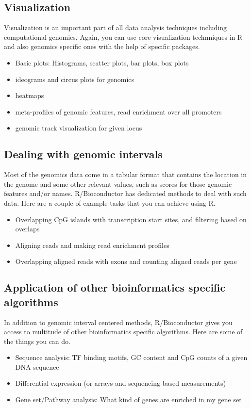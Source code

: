 \documentclass[english,nohyper]{tufte-book}\usepackage[]{graphicx}\usepackage[]{color}
\begin{document}
\subsection{Visualization}

Visualization is an important part of all data analysis techniques
including computational genomics. Again, you can use core visualization
technniques in R and also genomics specific ones with the help of
specific packages.
\begin{itemize}
\item Basic plots: Histograms, scatter plots, bar plots, box plots
\item ideograms and circus plots for genomics
\item heatmaps
\item meta-profiles of genomic features, read enrichment over all promoters
\item genomic track visualization for given locus
\end{itemize}

\subsection{Dealing with genomic intervals}

Most of the genomics data come in a tabular format that contains the
location in the genome and some other relevant values, such as scores
for those genomic features and/or names. R/Bioconductor has dedicated
methods to deal with such data. Here are a couple of example tasks
that you can achieve using R.
\begin{itemize}
\item Overlapping CpG islands with transcription start sites, and filtering
based on overlaps
\item Aligning reads and making read enrichment profiles
\item Overlapping aligned reads with exons and counting aligned reads per
gene
\end{itemize}

\subsection{Application of other bioinformatics specific algorithms}

In addition to genomic interval centered methods, R/Bioconductor gives
you access to multitude of other bioinformatics specific algorithms.
Here are some of the things you can do. 
\begin{itemize}
\item Sequence analysis: TF binding motifs, GC content and CpG counts of
a given DNA sequence
\item Differential expression (or arrays and sequencing based measurements)
\item Gene set/Pathway analysis: What kind of genes are enriched in my gene
set\end{itemize}
\end{document}
